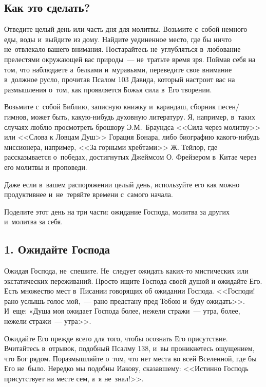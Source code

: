 \documentclass[12pt,article,a4paper,fittopage]{ncc}
\begin{document}
\begin{multicols}{2}
\section*{Как это сделать?}

Отведите целый день или часть дня для молитвы. Возьмите с~собой немного еды, воды и~выйдите из дому. Найдите уединенное место, где бы ничто не~отвлекало вашего внимания. Постарайтесь не~углубляться в~любование прелестями окружающей вас природы~--- не~тратьте время зря. Поймав себя на том, что наблюдаете а~белками и~муравьями, переведите свое внимание в~должное русло, прочитав Псалом 103 Давида, который настроит вас на размышления о~том, как проявляется Божья сила в~Его творении.

\pagestyle{lheadings}

Возьмите с~собой Библию, записную книжку и~карандаш, сборник песен/гимнов, может быть, какую-нибудь духовную литературу. Я, например, в~таких случаях люблю просмотреть брошюру Э.М.~Браундса <<Сила через молитву>> или <<Слова к Ловцам Душ>> Горация Бонара, либо биографию какого-нибудь миссионера, например, <<За горными хребтами>> Ж. Тейлор, где рассказывается о~победах, достигнутых Джеймсом О. Фрейзером в~Китае через его молитвы и~проповеди.

Даже если в~вашем распоряжении целый день, используйте его как можно продуктивнее и~не~теряйте времени с~самого начала.

Поделите этот день на три части: ожидание Господа, молитва за других и~молитва за себя.

\subsection*{1. Ожидайте Господа}

Ожидая Господа, не~спешите. Не~следует ожидать каких-то мистических или экстатических переживаний. Просто ищите Господа своей душой и ожидайте Его. Есть множество мест в~Писании говорящих об ожидании Господа. <<Господи! рано услышь голос мой,~--- рано предстану пред Тобою и~буду ожидать>>.  И~еще: «Душа моя ожидает Господа более, нежели стражи~--- утра, более, нежели стражи~--- утра>>.

Ожидайте Его прежде всего для того, чтобы осознать Его присутствие. Вчитайтесь в~отрывок, подобный Псалму 138, и~вы проникнетесь ощущением, что Бог рядом. Поразмышляйте о~том, что нет места во всей Вселенной, где бы Его не~было. Нередко мы подобны Иакову, сказавшему: <<Истинно Господь присутствует на месте сем, а~я не~знал!>>.


\end{multicols}
\end{document}
